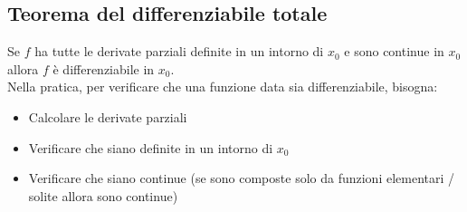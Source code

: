 \documentclass[12pt,a4paper]{article}
\begin{document}
\subsection{Teorema del differenziabile totale}
Se $f$ ha tutte le derivate parziali definite in un intorno di $x_0$ e sono continue in $x_0$ allora $f$ è differenziabile in $x_0$.\\
Nella pratica, per verificare che una funzione data sia differenziabile, bisogna:
\begin{itemize}
  \item Calcolare le derivate parziali
  \item Verificare che siano definite in un intorno di $x_0$
  \item Verificare che siano continue (se sono composte solo da funzioni elementari / solite allora sono continue)
\end{itemize}
\end{document}
